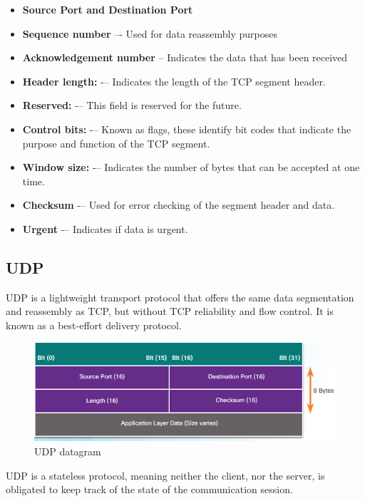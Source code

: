 \begin{itemize}
\item \textbf{Source Port and Destination Port}

\item \textbf{Sequence number} –- Used for data reassembly purposes

\item \textbf{Acknowledgement number} – Indicates the data that has been received

\item \textbf{Header length:} -– Indicates the length of the TCP segment header.
\item \textbf{Reserved:} -– This field is reserved for the future.
\item \textbf{Control bits:} -– Known as flags, these identify bit codes that indicate the purpose and function of the TCP segment.
\item \textbf{Window size:} -– Indicates the number of bytes that can be accepted at
one time.
\item \textbf{Checksum} -– Used for error checking of the segment header and data.
\item \textbf{Urgent} -– Indicates if data is urgent.
\end{itemize}

\subsection{UDP}

UDP is a lightweight transport protocol that offers the same data segmentation and reassembly as TCP, but without TCP reliability and flow control. It is known as a best-effort delivery protocol. \\

\begin{figure}[hbtp]
\caption{UDP datagram}\label{UDPheader}
\centering
\includegraphics[scale=0.5]{pictures/UDPheader.PNG}
\end{figure}


UDP is a stateless protocol, meaning neither the client, nor the server, is obligated to keep track of the state of the communication session. \\

